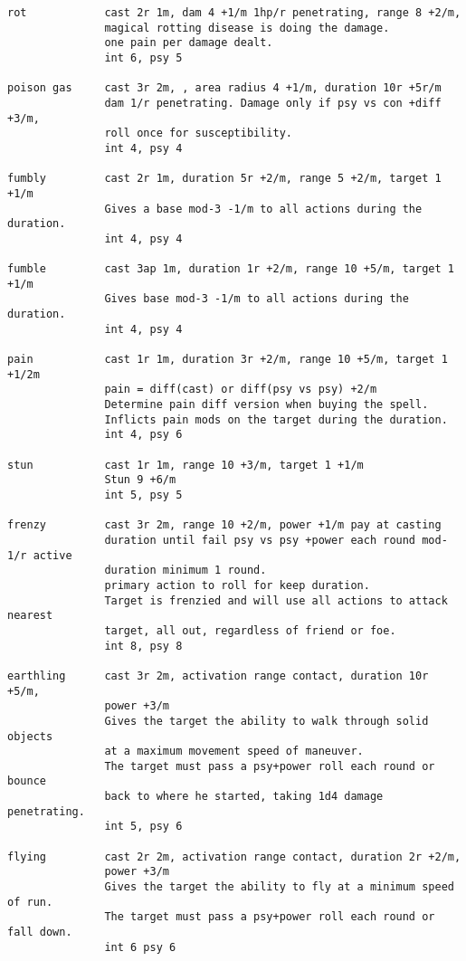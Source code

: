 \begin{verbatim}
rot            cast 2r 1m, dam 4 +1/m 1hp/r penetrating, range 8 +2/m,
               magical rotting disease is doing the damage.
               one pain per damage dealt.
               int 6, psy 5

poison gas     cast 3r 2m, , area radius 4 +1/m, duration 10r +5r/m
               dam 1/r penetrating. Damage only if psy vs con +diff +3/m,
               roll once for susceptibility.
               int 4, psy 4

fumbly         cast 2r 1m, duration 5r +2/m, range 5 +2/m, target 1 +1/m
               Gives a base mod-3 -1/m to all actions during the duration.
               int 4, psy 4

fumble         cast 3ap 1m, duration 1r +2/m, range 10 +5/m, target 1 +1/m
               Gives base mod-3 -1/m to all actions during the duration.
               int 4, psy 4

pain           cast 1r 1m, duration 3r +2/m, range 10 +5/m, target 1 +1/2m
               pain = diff(cast) or diff(psy vs psy) +2/m
               Determine pain diff version when buying the spell.
               Inflicts pain mods on the target during the duration.
               int 4, psy 6

stun           cast 1r 1m, range 10 +3/m, target 1 +1/m
               Stun 9 +6/m
               int 5, psy 5

frenzy         cast 3r 2m, range 10 +2/m, power +1/m pay at casting
               duration until fail psy vs psy +power each round mod-1/r active
               duration minimum 1 round.
               primary action to roll for keep duration.
               Target is frenzied and will use all actions to attack nearest
               target, all out, regardless of friend or foe.
               int 8, psy 8

earthling      cast 3r 2m, activation range contact, duration 10r +5/m,
               power +3/m
               Gives the target the ability to walk through solid objects
               at a maximum movement speed of maneuver.
               The target must pass a psy+power roll each round or bounce
               back to where he started, taking 1d4 damage penetrating.
               int 5, psy 6

flying         cast 2r 2m, activation range contact, duration 2r +2/m,
               power +3/m
               Gives the target the ability to fly at a minimum speed of run.
               The target must pass a psy+power roll each round or fall down.
               int 6 psy 6


\end{verbatim}
